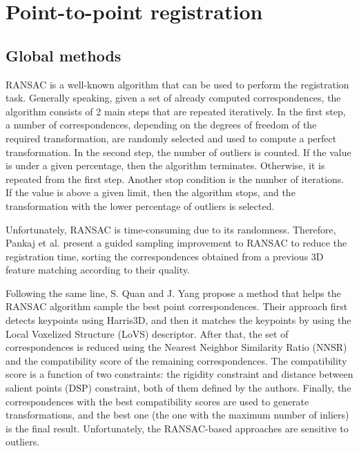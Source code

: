     \section{Point-to-point registration}
        \subsection{Global methods}

        RANSAC \cite{Fischler_1981_RANSAC} is a well-known algorithm that can be used to perform the registration task. 
        Generally speaking, given a set of already computed correspondences, the algorithm consists of 2 main steps that are repeated iteratively. 
        In the first step, a number of correspondences, depending on the degrees of freedom of the required transformation, 
        are randomly selected and used to compute a perfect transformation. 
        In the second step, the number of outliers is counted. 
        If the value is under a given percentage, then the algorithm terminates. Otherwise, it is repeated from the first step. 
        Another stop condition is the number of iterations. 
        If the value is above a given limit, then the algorithm stops, and the transformation with the lower percentage of outliers is selected.
        
        Unfortunately, RANSAC is time-consuming due to its randomness.
        Therefore, Pankaj et al. \cite{Pankaj_2015_arobust} present a guided sampling improvement to RANSAC
        to reduce the registration time, sorting the correspondences obtained from a previous 3D feature matching according to their quality.
        
        Following the same line, S. Quan and J. Yang \cite{Quan_2020_com} propose a method that helps the RANSAC algorithm 
        sample the best point correspondences. Their approach first detects keypoints using Harris3D, and then it matches the keypoints
        by using the Local Voxelized Structure (LoVS) descriptor. 
        After that, the set of correspondences is reduced using the Nearest Neighbor Similarity Ratio (NNSR) and the compatibility score of the remaining correspondences. 
        The compatibility score is a function of two constraints: the rigidity constraint and distance between salient points (DSP) constraint, 
        both of them defined by the authors.
        Finally, the correspondences with the best compatibility scores are used to generate transformations,
        and the best one (the one with the maximum number of inliers) is the final result. Unfortunately, the RANSAC-based approaches are sensitive to outliers.

